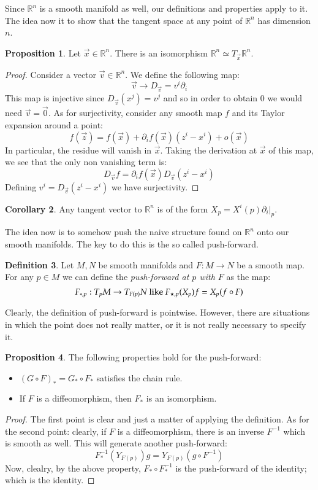 \documentclass[12pt,a4paper]{report}
\theoremstyle{definition}
\newtheorem{Def}{Definition}[chapter]
\theoremstyle{Theorem}
\newtheorem{Prop}[Def]{Proposition}
\theoremstyle{break}
\theoremstyle{definition}
\newtheorem{Cor}[Def]{Corollary}
\begin{document}
			Since $\mathbb{R}^n$ is a smooth manifold as well, our definitions and properties apply to it. The idea now it to show that the tangent space at any point of $\mathbb{R}^n$ has dimension $n$.
			\begin{Prop}
				Let $\vec{x}\in\mathbb{R}^n$. There is an isomorphism $\mathbb{R}^n\simeq T_{\vec{x}}\mathbb{R}^n$.
			\end{Prop}
			\begin{proof}
				Consider a vector $\vec{v}\in\mathbb{R}^n$. We define the following map:
				$$\vec{v}\rightarrow D_{\vec{v}}=v^i\partial_i$$
				This map is injective since $D_{\vec{v}}(x^j)=v^j$ and so in order to obtain 0 we would need $\vec{v}=\vec{0}$. As for surjectivity, consider any smooth map $f$ and its Taylor expansion around a point:
				$$f(\vec{z})=f(\vec{x})+\partial_i f(\vec{x})(z^i-x^i)+o(\vec{x})$$
				In particular, the residue will vanish in $\vec{x}$. Taking the derivation at $\vec{x}$ of this map, we see that the only non vanishing term is:
				$$D_{\vec{v}}f=\partial_i f(\vec{x})D_{\vec{v}}(z^i-x^i)$$
				Defining $v^i=D_{\vec{v}}(z^i-x^i)$ we have surjectivity.
			\end{proof}
			\begin{Cor}
				Any tangent vector to $\mathbb{R}^n$ is of the form $X_p=X^i(p)\partial_i\big|_p$.
			\end{Cor}
			The idea now is to somehow push the naive structure found on $\mathbb{R}^n$ onto our smooth manifolds. The key to do this is the so called push-forward.
			\begin{Def}
				Let $M,N$ be smooth manifolds and $F:M\rightarrow N$ be a smooth map. For any $p\in M$ we can define the \textit{push-forward at $p$ with $F$} as the map:
				$$F_{*,p}:T_pM\rightarrow T_{F(p)}N\hbox{ like }F_{\star,p}(X_p)f=X_p(f\circ F)$$
			\end{Def}
			Clearly, the definition of push-forward is pointwise. However, there are situations in which the point does not really matter, or it is not really necessary to specify it.
			\begin{Prop}
				The following properties hold for the push-forward:
				\begin{itemize}
					\item $(G\circ F)_*=G_*\circ F_*$ satisfies the chain rule.
					\item If $F$ is a diffeomorphism, then $F_*$ is an isomorphism.
				\end{itemize}
				\begin{proof}
					The first point is clear and just a matter of applying the definition. As for the second point: clearly, if $F$ is a diffeomorphism, there is an inverse $F^{-1}$ which is smooth as well. This will generate another push-forward:
					$$F^{-1}_*(Y_{F(p)})g=Y_{F(p)}(g\circ F^{-1})$$
					Now, clealry, by the above property, $F_*\circ F_*^{-1}$ is the push-forward of the identity; which is the identity.
				\end{proof}
			\end{Prop}
\end{document}
